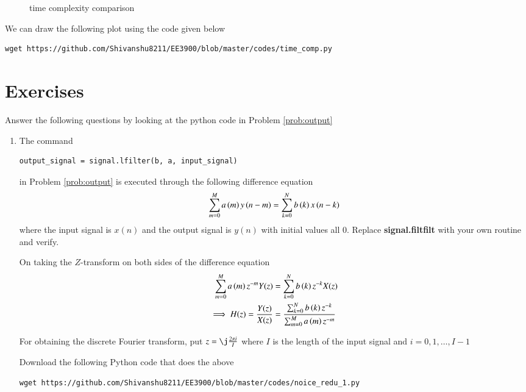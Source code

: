 \documentclass[journal,12pt,twocolumn]{IEEEtran}
\renewcommand\thesection{\arabic{section}}
\begin{document}
\begin{enumerate}[label=\arabic*.,ref=\thesection.\theenumi]
\begin{figure}[!ht]
               \caption{time complexity comparison}
               \label{time complexity comparison}
          \end{figure}
          We can draw the following plot using the code given below 
          \begin{lstlisting}
wget https://github.com/Shivanshu8211/EE3900/blob/master/codes/time_comp.py
          \end{lstlisting}
     \end{enumerate}
     
     \section{Exercises}
     Answer the following questions by looking at the python code in Problem \ref{prob:output}
     \begin{enumerate}[label=\thesection.\arabic*]
          \item The command
               \begin{lstlisting}
output_signal = signal.lfilter(b, a, input_signal)
               \end{lstlisting}
               in Problem \ref{prob:output} is executed through the following difference equation
               \begin{equation}
                    \label{eq:iir_filter_gen}
                    \sum _{m=0}^{M}a\left(m\right)y\left(n-m\right)=\sum _{k=0}^{N}b\left(k\right)x\left(n-k\right)
               \end{equation}
               where the input signal is $x(n)$ and the output signal is $y(n)$ with initial values all 0. Replace \textbf{signal.filtfilt} with your own routine and verify.

               \solution On taking the $Z$-transform on both sides of the difference equation
               \begin{align}
                    \sum _{m=0}^{M}a\left(m\right) z^{-m} Y(z) & = \sum _{k=0}^{N}b\left(k\right) z^{-k} X(z)                                    \\
                    \implies H(z) = \frac{Y(z)}{X(z)}    & = \frac{\sum _{k=0}^{N}b\left(k\right) z^{-k}}{\sum _{m=0}^{M}a\left(m\right) z^{-m}}
               \end{align}

               For obtaining the discrete Fourier transform, put $z = \j \frac{2\pi i}{I}$ where $I$ is the length of the input signal and $i = 0, 1, \ldots, I-1$

               Download the following Python code that does the above
               \begin{lstlisting}
wget https://github.com/Shivanshu8211/EE3900/blob/master/codes/noice_redu_1.py
               \end{lstlisting}


\end{enumerate}
\end{document}
